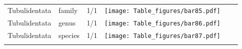 \begin{longtable}{lL{1.8cm}C{2cm}lcc}
  Tubulidentata & family & 1/1 & \texttt{[image: Table\_figures/bar85.pdf]} &   &   \\ 
  Tubulidentata & genus & 1/1 & \texttt{[image: Table\_figures/bar86.pdf]} &   &   \\ 
  Tubulidentata & species & 1/1 & \texttt{[image: Table\_figures/bar87.pdf]} &   &   \\ 
   \hline
\hline
\label{Table_results}
\end{longtable}
